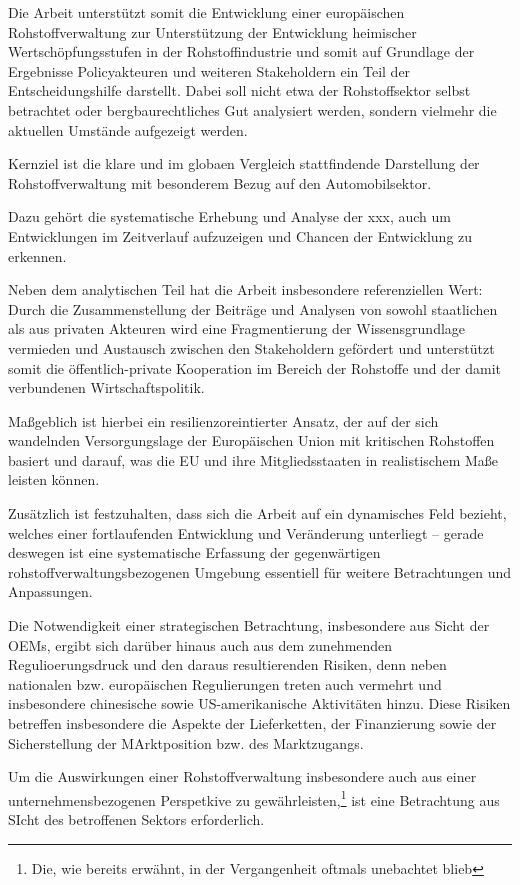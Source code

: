 \documentclass[12pt,a4paper,oneside]{book} %
\begin{document}
Die Arbeit unterstützt somit die Entwicklung einer europäischen Rohstoffverwaltung zur Unterstützung der Entwicklung heimischer Wertschöpfungsstufen in der Rohstoffindustrie und somit auf Grundlage der Ergebnisse Policyakteuren und weiteren Stakeholdern ein Teil der Entscheidungshilfe darstellt. Dabei soll nicht etwa der Rohstoffsektor selbst betrachtet oder bergbaurechtliches Gut analysiert werden, sondern vielmehr die aktuellen Umstände aufgezeigt werden.

Kernziel ist die klare und im globaen Vergleich stattfindende Darstellung der Rohstoffverwaltung mit besonderem Bezug auf den Automobilsektor.

Dazu gehört die systematische Erhebung und Analyse der xxx, auch um Entwicklungen im Zeitverlauf aufzuzeigen und Chancen der Entwicklung zu erkennen.

Neben dem analytischen Teil hat die Arbeit insbesondere referenziellen Wert: Durch die Zusammenstellung der Beiträge und Analysen von sowohl staatlichen als aus privaten Akteuren wird eine Fragmentierung der Wissensgrundlage vermieden und Austausch zwischen den Stakeholdern gefördert und unterstützt somit die öffentlich-private Kooperation im Bereich der Rohstoffe und der damit verbundenen Wirtschaftspolitik.

Maßgeblich ist hierbei ein resilienzoreintierter Ansatz, der auf der sich wandelnden Versorgungslage der Europäischen Union mit kritischen Rohstoffen basiert und darauf, was die EU und ihre Mitgliedsstaaten in realistischem Maße leisten können.

Zusätzlich ist festzuhalten, dass sich die Arbeit auf ein dynamisches Feld bezieht, welches einer fortlaufenden Entwicklung und Veränderung unterliegt -- gerade deswegen ist eine systematische Erfassung der gegenwärtigen rohstoffverwaltungsbezogenen Umgebung essentiell für weitere Betrachtungen und Anpassungen.

Die Notwendigkeit einer strategischen Betrachtung, insbesondere aus Sicht der OEMs, ergibt sich darüber hinaus auch aus dem zunehmenden Regulioerungsdruck und den daraus resultierenden Risiken, denn neben nationalen bzw. europäischen Regulierungen treten auch vermehrt und insbesondere chinesische sowie US-amerikanische Aktivitäten hinzu. Diese Risiken betreffen insbesondere die Aspekte der Lieferketten, der Finanzierung sowie der Sicherstellung der MArktposition bzw. des Marktzugangs.

Um die Auswirkungen einer Rohstoffverwaltung insbesondere auch aus einer unternehmensbezogenen Perspetkive zu gewährleisten,\footnote{Die, wie bereits erwähnt, in der Vergangenheit oftmals unebachtet blieb} ist eine Betrachtung aus SIcht des betroffenen Sektors erforderlich.
\end{document}
